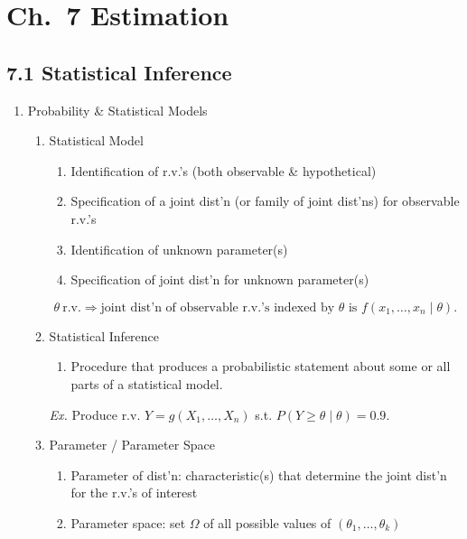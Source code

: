 \documentclass[11pt]{article}
\begin{document}
\section*{Ch.\ 7 Estimation}
\subsection*{7.1 Statistical Inference}
\begin{enumerate}[label=\Roman*.]
  \item Probability \& Statistical Models
  \begin{enumerate}[label=\Alph*.]
    \item Statistical Model
    \begin{enumerate}[label=\arabic*.]
      \item Identification of r.v.'s (both observable \& hypothetical)
      \item Specification of a joint dist'n (or family of joint dist'ns) for observable r.v.'s
      \item Identification of unknown parameter(s)
      \item Specification of joint dist'n for unknown parameter(s)
    \end{enumerate}
    \[
      \theta\ \text{r.v.} \Rightarrow \text{joint dist'n of observable r.v.'s indexed by }\theta\text{ is } f(x_{1},\dots,x_{n}\mid\theta).
    \]
    \item Statistical Inference
    \begin{enumerate}[label=\arabic*.]
      \item Procedure that produces a probabilistic statement about some or all parts of a statistical model.
    \end{enumerate}
    \textit{Ex.} Produce r.v. $Y=g(X_{1},\dots,X_{n})$ s.t. $P(Y\ge \theta\mid\theta)=0.9$.
    \item Parameter / Parameter Space
    \begin{enumerate}[label=\arabic*.]
      \item Parameter of dist'n: characteristic(s) that determine the joint dist'n for the r.v.'s of interest
      \item Parameter space: set $\Omega$ of all possible values of $(\theta_{1},\dots,\theta_{k})$
    \end{enumerate}
  \end{enumerate}


\end{enumerate}
\end{document}
